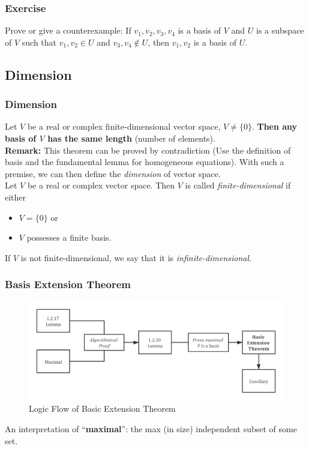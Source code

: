 \documentclass[12pt, t]{beamer}
\renewcommand{\emph}[1]{{\color{Turquoise3}\textsl{#1}}}
\newcommand{\nullspace}{~\\[15pt]}
\begin{document}
\begin{frame}
    \frametitle{Exercise}
    Prove or give a counterexample: If $v_1,v_2,v_3,v_4$ is a basis of $V$ and $U$ is a subspace of $V$ such that $v_1,v_2\in U$ and $v_3,v_4\notin U$, then $v_1,v_2$ is a basis of $U$.


\end{frame}

\subsection{Dimension}
\begin{frame}
    \frametitle{Dimension}
    Let $V$ be a real or complex finite-dimensional vector space, $V\neq\{0\}$. \textbf{Then any basis of $V$ has the same length }(number of elements).
    \nullspace
    \textbf{Remark:} This theorem can be proved by contradiction (Use the definition of basis and the fundamental lemma for homogeneous equations). With such a premise, we can then define the \emph{dimension} of vector space.
    \nullspace
    Let $V$ be a real or complex vector space. Then $V$ is called \emph{finite-dimensional} if either
    \begin{itemize}
        \item $V=\{0\}$ or
        \item $V$ possesses a finite basis.
    \end{itemize}
    If $V$ is not finite-dimensional, we say that it is \emph{infinite-dimensional}.
\end{frame}

\begin{frame}
    \frametitle{Basis Extension Theorem}
    \begin{figure}[H]
        \centering
        \includegraphics[width=\textwidth]{chart1.png}
        \caption{Logic Flow of Basic Extension Theorem}
        \label{fig:bet}
    \end{figure}
    An interpretation of ``\textbf{maximal}'': the max (in size) independent subset of some set.
\end{frame}
\end{document}
